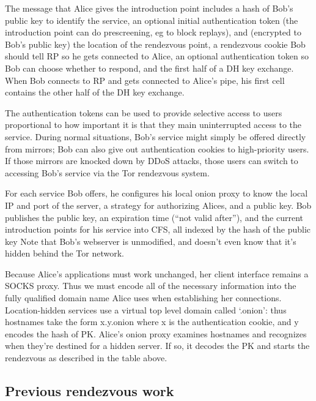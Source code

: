 \documentclass[times,10pt,twocolumn]{article}
\begin{document}
The message that Alice gives the introduction point includes a hash of Bob's
public key to identify the service, an optional initial authentication
token (the introduction point can do prescreening, eg to block replays),
and (encrypted to Bob's public key) the location of the rendezvous point,
a rendezvous cookie Bob should tell RP so he gets connected to
Alice, an optional authentication token so Bob can choose whether to respond,
and the first half of a DH key exchange. When Bob connects to RP
and gets connected to Alice's pipe, his first cell contains the
other half of the DH key exchange.

The authentication tokens can be used to provide selective access to users
proportional to how important it is that they main uninterrupted access
to the service. During normal situations, Bob's service might simply be
offered directly from mirrors; Bob can also give out authentication cookies
to high-priority users. If those mirrors are knocked down by DDoS attacks,
those users can switch to accessing Bob's service via the Tor
rendezvous system.


For each service Bob offers, he configures his local onion proxy to know
the local IP and port of the server, a strategy for authorizing Alices,
and a public key.   Bob publishes
the public key, an expiration
time (``not valid after''), and the current introduction points for
his
service into CFS, all indexed by the hash of the public key
Note that Bob's webserver is unmodified, and doesn't even know
that it's hidden behind the Tor network.

Because Alice's applications must work unchanged, her client interface
remains a SOCKS proxy.  Thus we must encode all of the necessary
information into the fully qualified domain name Alice uses when
establishing her connections.  Location-hidden services use a virtual
top level domain called `.onion': thus hostnames take the form
x.y.onion where x is the authentication cookie, and y encodes the hash
of PK. Alice's onion proxy examines hostnames and recognizes when
they're destined for a hidden server. If so, it decodes the PK and
starts the rendezvous as described in the table above.

\subsection{Previous rendezvous work}
\end{document}
